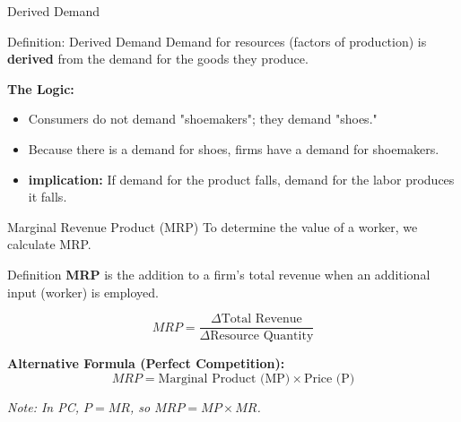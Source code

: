 \documentclass[aspectratio=169]{beamer}
\begin{document}
\begin{frame}{Derived Demand}
    \begin{alertblock}{Definition: Derived Demand}
        Demand for resources (factors of production) is \textbf{derived} from the demand for the goods they produce.
    \end{alertblock}

    \vspace{0.5cm}
    \textbf{The Logic:}
    \begin{itemize}
        \item Consumers do not demand "shoemakers"; they demand "shoes."
        \item Because there is a demand for shoes, firms have a demand for shoemakers.
        \item \textbf{implication:} If demand for the product falls, demand for the labor produces it falls.
    \end{itemize}
\end{frame}

\begin{frame}{Marginal Revenue Product (MRP)}
    To determine the value of a worker, we calculate MRP.
    
    \begin{block}{Definition}
        \textbf{MRP} is the addition to a firm's total revenue when an additional input (worker) is employed.
    \end{block}

    \begin{equation*}
        MRP = \frac{\Delta \text{Total Revenue}}{\Delta \text{Resource Quantity}}
    \end{equation*}

    \textbf{Alternative Formula (Perfect Competition):}
    \begin{equation*}
        MRP = \text{Marginal Product (MP)} \times \text{Price (P)}
    \end{equation*}
    
    \small{\textit{Note: In PC, $P = MR$, so $MRP = MP \times MR$.}}
\end{frame}
\end{document}
